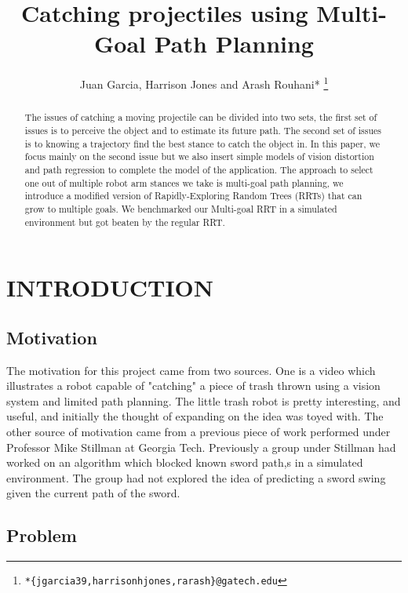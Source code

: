 \documentclass[letterpaper, 10 pt, conference]{ieeeconf}  %
\title{\LARGE \bf
Catching projectiles using Multi-Goal Path Planning
}
\author{Juan Garcia, Harrison Jones and Arash Rouhani*
  \thanks{\texttt{*\{jgarcia39,harrisonhjones,rarash\}@gatech.edu}}
}
\begin{document}
\maketitle
\thispagestyle{empty}
\pagestyle{empty}


\begin{abstract}

The issues of catching a moving projectile can be divided into two sets,
the first set of issues is to perceive the object and to estimate its
future path.  The second set of issues is to knowing a trajectory find
the best stance to catch the object in. In this paper, we focus mainly
on the second issue but we also insert simple models of vision
distortion and path regression to complete the model of the application.
The approach to select one out of multiple robot arm stances we take is
multi-goal path planning, we introduce a modified version of
Rapidly-Exploring Random Trees (RRTs) that can grow to multiple goals.
We benchmarked our Multi-goal RRT in a simulated environment but got
beaten by the regular RRT.

\end{abstract}


\section{INTRODUCTION}

\subsection{Motivation}

The motivation for this project came from two sources. One is a video which
illustrates a robot capable of "catching" a piece of trash thrown using a
vision system and limited path planning. The little trash robot is pretty
interesting, and useful, and initially the thought of expanding on the idea was
toyed with. The other source of motivation came from a previous piece of work
performed under Professor Mike Stillman at Georgia Tech. Previously a group
under Stillman had worked on an algorithm which blocked known sword path,s in a
simulated environment. The group had not explored the idea of predicting a
sword swing given the current path of the sword.

\subsection{Problem}
\end{document}
